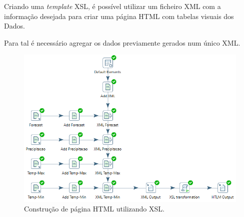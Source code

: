 Criando uma \textit{template} XSL, é possível utilizar um ficheiro XML com a informação desejada para criar uma página HTML com tabelas visuais dos Dados.

Para tal é necessário agregar os dados previamente gerados num único XML.

\begin{figure}[H]
    \centering
    \includegraphics[scale=0.6]{imagens-spoon/html.png}
    \caption{Construção de página HTML utilizando XSL.}
\end{figure}


\newpage